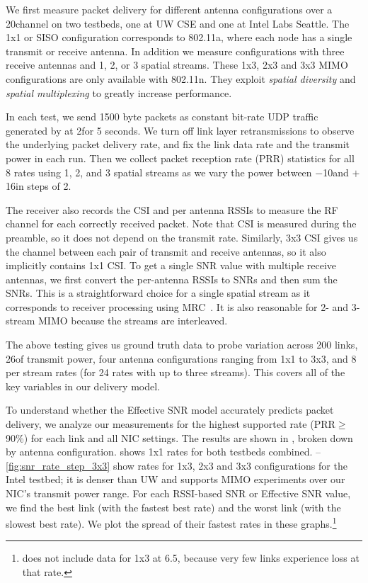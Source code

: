 We first measure packet delivery for different antenna configurations over a 20\MHz channel on two  testbeds, one at UW CSE and one at Intel Labs Seattle. The 1x1 or SISO configuration corresponds to 802.11a, where each node has a single transmit or receive antenna. In addition we measure configurations with three receive antennas and 1, 2, or 3 spatial streams. These 1x3, 2x3 and 3x3 MIMO configurations are only available with 802.11n. They exploit \emph{spatial diversity} and \emph{spatial multiplexing} to greatly increase performance.

In each test, we send 1500 byte packets as constant bit-rate UDP traffic generated by  at 2\Mbps for 5 seconds. 
We turn off link layer retransmissions to observe the underlying packet delivery rate, and fix the link data rate and the transmit power in each run. Then we collect packet reception rate (PRR) statistics for all 8 rates using 1, 2, and 3 spatial streams as we vary the power between $-$10\dBm and $+$16\dBm in steps of 2\dB.

The receiver also records the CSI and per antenna RSSIs to measure the RF channel for each correctly received packet. Note that CSI is measured during the preamble, so it does not depend on the transmit rate. Similarly, 3x3 CSI gives us the channel between each pair of transmit and receive antennas, so it also implicitly contains 1x1 CSI\@. To get a single SNR value with multiple receive antennas, we first convert the per-antenna RSSIs to SNRs and then sum the SNRs.
This is a straightforward choice for a single spatial stream as it corresponds to receiver processing using MRC~\cite{Goldsmith}.
It is also reasonable for 2- and 3-stream MIMO because the streams are interleaved.

The above testing gives us ground truth data to probe variation across 200 links, 26\dB of transmit power, four antenna configurations ranging from 1x1 to 3x3, and 8 per stream rates (for 24 rates with up to three streams). This covers all of the key variables in our delivery model.

 To understand whether the Effective SNR model accurately predicts packet delivery, we analyze our measurements for the highest supported rate (PRR$\geq$ 90\%) for each link and all NIC settings. The results are shown in , broken down by antenna configuration.  shows 1x1 rates for both testbeds combined. --\ref{fig:snr_rate_step_3x3}  show rates for 1x3, 2x3 and 3x3 configurations for the Intel testbed; it is denser than UW and supports MIMO experiments over our NIC's transmit power range.
For each RSSI-based SNR or Effective SNR value, we find the best link (with the fastest best rate) and the worst link (with the slowest best rate). We plot the spread of their fastest rates in these graphs.\footnote{ does not include data for 1x3 at 6.5\Mbps, because very few links experience loss at that rate.}

